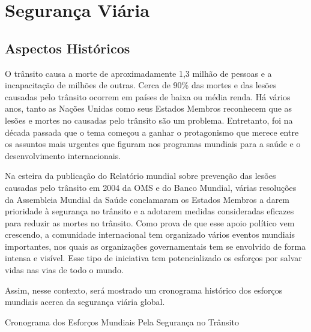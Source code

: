 \chapter{Segurança Viária}

\section{Aspectos Históricos}

O trânsito causa a morte de aproximadamente 1,3 milhão de pessoas e a incapacitação de milhões de outras. Cerca de 90\% das mortes e das lesões causadas pelo trânsito ocorrem em países de baixa ou média renda. Há vários anos, tanto as Nações Unidas como seus Estados Membros reconhecem que as lesões e mortes no causadas pelo trânsito são um problema. Entretanto, foi na década passada que o tema começou a ganhar o protagonismo que merece entre os assuntos mais urgentes que ﬁguram nos programas mundiais para a saúde e o desenvolvimento internacionais.\vskip0.3cm


Na esteira da publicação do Relatório mundial sobre prevenção das lesões causadas pelo trânsito em 2004 da OMS e do Banco Mundial, várias resoluções da Assembleia Mundial da Saúde conclamaram os Estados Membros a darem prioridade à segurança no trânsito e a adotarem medidas consideradas eﬁcazes para reduzir as mortes no trânsito. Como prova de que esse apoio político vem crescendo, a comunidade internacional tem organizado vários eventos mundiais importantes, nos quais as organizações governamentais tem se envolvido de forma intensa e visível. Esse tipo de iniciativa tem potencializado os esforços por salvar vidas nas vias de todo o mundo.\vskip0.3cm


Assim, nesse contexto, será mostrado um cronograma histórico dos esforços mundiais acerca da segurança viária global.\vskip0.3cm

 
Cronograma dos Esforços Mundiais Pela Segurança no Trânsito 


